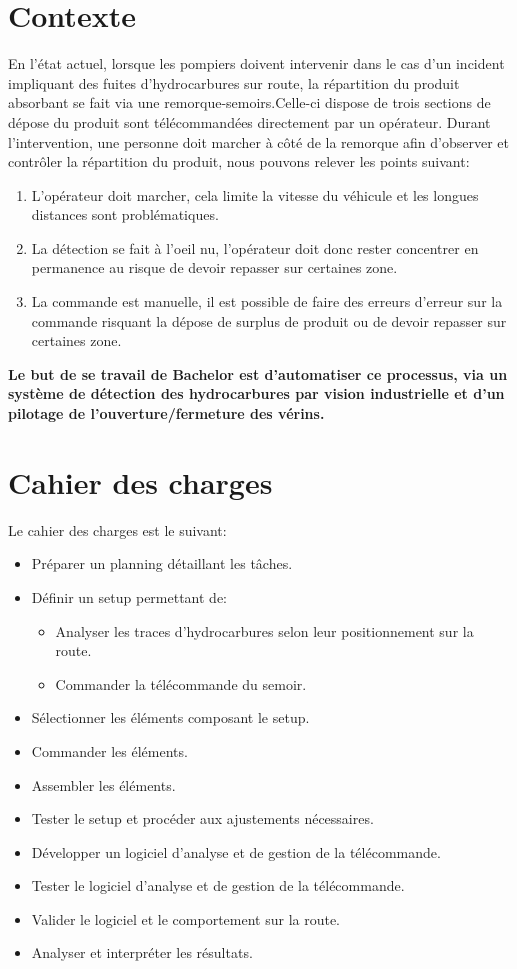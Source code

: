 \section{Contexte}
En l'état actuel, lorsque les pompiers doivent intervenir dans le cas d'un incident impliquant des fuites d'hydrocarbures sur route, la répartition
du produit absorbant se fait via une remorque-semoirs.Celle-ci dispose de trois sections de dépose du produit sont télécommandées directement par un opérateur.
Durant l'intervention, une personne doit marcher à côté de la remorque afin d'observer et contrôler la répartition du produit, nous pouvons relever les points suivant:
\begin{enumerate}
    \item L'opérateur doit marcher, cela limite la vitesse du véhicule et les longues distances sont problématiques.
    \item La détection se fait à l'oeil nu, l'opérateur doit donc rester concentrer en permanence au risque de devoir repasser sur certaines zone.
    \item La commande est manuelle, il est possible de faire des erreurs d'erreur sur la commande risquant la dépose de surplus de produit ou de devoir repasser sur certaines zone.
\end{enumerate}
\textbf{Le but de se travail de Bachelor est d'automatiser ce processus, via un système de détection des hydrocarbures par vision industrielle et d'un pilotage de l'ouverture/fermeture des vérins.}
\section{Cahier des charges \label{cdc}}
Le cahier des charges est le suivant:
\begin{itemize}
    \item Préparer un planning détaillant les tâches.
    \item Définir un setup permettant de:
          \begin{itemize}
              \item Analyser les traces d'hydrocarbures selon leur positionnement sur la route.
              \item Commander la télécommande du semoir.
          \end{itemize}
    \item Sélectionner les éléments composant le setup.
    \item Commander les éléments.
    \item Assembler les éléments.
    \item Tester le setup et procéder aux ajustements nécessaires.
    \item Développer un logiciel d'analyse et de gestion de la télécommande.
    \item Tester le logiciel d'analyse et de gestion de la télécommande.
    \item Valider le logiciel et le comportement sur la route.
    \item Analyser et interpréter les résultats.
\end{itemize}
